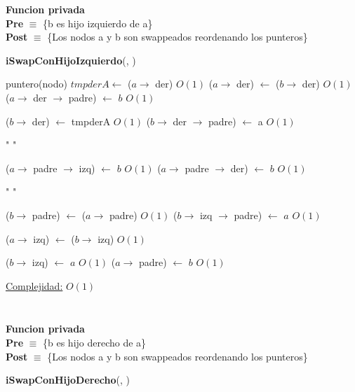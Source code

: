 \begin{Algoritmos}
\textbf{Funcion privada}\\
\textbf{Pre} $\equiv$ \{b es hijo izquierdo de a\}\\%
\textbf{Post} $\equiv$ \{Los nodos a y b son swappeados reordenando los punteros\}%
\begin{algorithm}[H]
{\textbf{iSwapConHijoIzquierdo}(, )}
\begin{algorithmic}[1]

    \State puntero(nodo) $tmpderA \gets$ ($a \to$ der) \Comment $O(1)$
    \State ($a \to$ der) $\gets$ ($b \to$ der)  \Comment $O(1)$
        \State ($a \to$ der $\to$ padre) $\gets$ $b$ \Comment $O(1)$
    \EndIf

    \State ($b \to$ der) $\gets$ tmpderA  \Comment $O(1)$
        \State ($b \to$ der $\to$ padre) $\gets$ a  \Comment $O(1)$
    \EndIf
    
    \State " "

        \State ($a \to$ padre $\to$ izq) $\gets$ $b$ \Comment $O(1)$
    \Else {}
        \State ($a \to$ padre $\to$ der) $\gets$ $b$ \Comment $O(1)$
    \EndIf
    \EndIf
    
    \State " "

    \State ($b \to$ padre) $\gets$ ($a \to$ padre) \Comment $O(1)$
        \State ($b \to$ izq $\to$ padre) $\gets$ $a$ \Comment $O(1)$
    \EndIf
    
    \State ($a \to$ izq) $\gets$ ($b \to$ izq) \Comment $O(1)$
    
    \State ($b \to$ izq) $\gets$ $a$ \Comment $O(1)$
    \State ($a \to$ padre) $\gets$ $b$ \Comment $O(1)$





    \medskip
    \Statex \underline{Complejidad:} $O(1)$

\end{algorithmic}
\end{algorithm}

$ $\newline


$ $\newline

\textbf{Funcion privada}\\
\textbf{Pre} $\equiv$ \{b es hijo derecho de a\}\\%
\textbf{Post} $\equiv$ \{Los nodos a y b son swappeados reordenando los punteros\}%
\begin{algorithm}[H]
{\textbf{iSwapConHijoDerecho}(, )}
\begin{algorithmic}[1]


\end{algorithmic}
\end{algorithm}
\end{Algoritmos}
